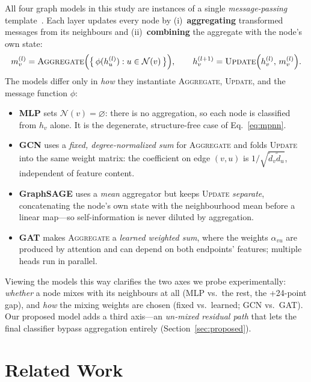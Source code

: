 \documentclass{article}
\begin{document}
All four graph models in this study are instances of a single \emph{message-passing}
template~\cite{kipf2017gcn,hamilton2017graphsage,velickovic2018gat}. Each layer updates
every node by (i)~\textbf{aggregating} transformed messages from its neighbours and
(ii)~\textbf{combining} the aggregate with the node's own state:
\begin{equation}
  m_v^{(l)} = \textsc{Aggregate}\Big(\big\{\, \phi(h_u^{(l)}) : u \in \mathcal{N}(v) \,\big\}\Big),
  \qquad
  h_v^{(l+1)} = \textsc{Update}\Big(h_v^{(l)},\, m_v^{(l)}\Big).
  \label{eq:mpnn}
\end{equation}
The models differ only in \emph{how} they instantiate \textsc{Aggregate},
\textsc{Update}, and the message function $\phi$:
\begin{itemize}
  \item \textbf{MLP} sets $\mathcal{N}(v)=\varnothing$: there is no aggregation, so each
        node is classified from $h_v$ alone. It is the degenerate, structure-free case
        of Eq.~\ref{eq:mpnn}.
  \item \textbf{GCN} uses a \emph{fixed, degree-normalized sum} for \textsc{Aggregate}
        and folds \textsc{Update} into the same weight matrix: the coefficient on edge
        $(v,u)$ is $1/\sqrt{\tilde{d}_v \tilde{d}_u}$, independent of feature content.
  \item \textbf{GraphSAGE} uses a \emph{mean} aggregator but keeps \textsc{Update}
        \emph{separate}, concatenating the node's own state with the neighbourhood
        mean before a linear map---so self-information is never diluted by aggregation.
  \item \textbf{GAT} makes \textsc{Aggregate} a \emph{learned weighted sum}, where the
        weights $\alpha_{vu}$ are produced by attention and can depend on both
        endpoints' features; multiple heads run in parallel.
\end{itemize}
Viewing the models this way clarifies the two axes we probe experimentally:
\emph{whether} a node mixes with its neighbours at all (MLP vs.\ the rest, the +24-point
gap), and \emph{how} the mixing weights are chosen (fixed vs.\ learned; GCN vs.\ GAT).
Our proposed model adds a third axis---an \emph{un-mixed residual path} that lets the
final classifier bypass aggregation entirely (Section~\ref{sec:proposed}).

\section{Related Work}
\label{sec:related}
\end{document}
